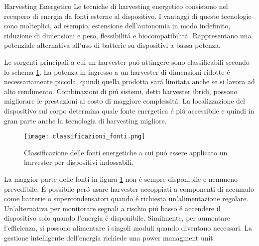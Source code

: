 \begin{section}{Harvesting Energetico}
    Le tecniche di harvesting energetico consistono nel recupero di energia da fonti esterne al dispositivo. I vantaggi di queste tecnologie sono molteplici, ad esempio, estensione dell'autonomia in modo indefinito, riduzione di dimensioni e peso, flessibilit\'a e biocompatibilit\'a. Rappresentano una potenziale alternativa all'uso di batterie su dispositivi a bassa potenza.

    Le sorgenti principali a cui un harvester pu\'o attingere sono classificabili secondo lo schema \ref{fig:classificazione}. La potenza in ingresso a un harvester di dimensioni ridotte \'e necessariamente piccola, quindi quella prodotta sar\'a limitata anche se si lavora ad alto rendimento. Combinazioni di pi\'u sistemi, detti harvester ibridi, possono migliorare le prestazioni al costo di maggiore complessit\'a. La localizzazione del dispositivo sul corpo determina quale fonte energetica \'e pi\'u accessibile e quindi in gran parte anche la tecnologia di harvesting migliore.
    \begin{figure}[H]
        \texttt{[image: classificazioni\_fonti.png]}
        \centering
        \caption{Classificazione delle fonti energetiche a cui pu\'o essere applicato un harvester per dispositivi indossabili.}
        \label{fig:classificazione}
    \end{figure}
    
    La maggior parte delle fonti in figura \ref{fig:classificazione} non \'e sempre disponibile e nemmeno prevedibile. \'E possibile per\'o usare harvester accoppiati a componenti di accumulo come batterie o supercondensatori quando \'e richiesta un'alimentazione regolare. Un'alternativa per monitorare segnali a rischio pi\'u basso \'e accendere il dispositivo solo quando l'energia \'e disponibile. Similmente, per aumentare l'efficienza, si possono alimentare i singoli moduli quando diventano necessari. La gestione intelligente dell'energia richiede una power managment unit.
\end{section}

